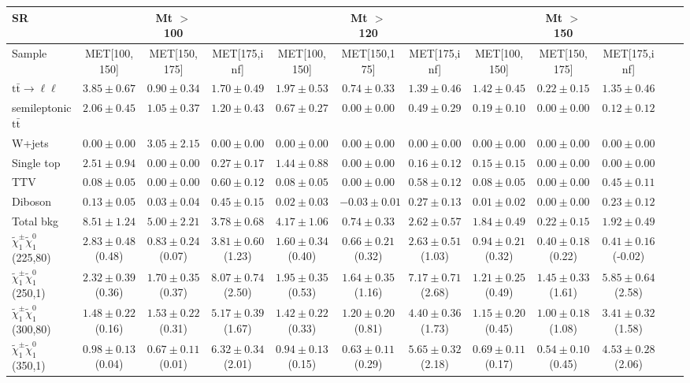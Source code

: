 \begin{table}
\begin{center}
\small
\begin{tabular}{lccccccccccc}
\hline
SR & & Mt $>$ 100 & & & Mt $>$ 120 & & &Mt $>$ 150 & & &\\
\hline
Sample&MET[100,150]&MET[150,175]&MET[175,inf]&MET[100,150]&MET[150,175]&MET[175,inf]&MET[100,150]&MET[150,175]&MET[175,inf]&\\
\hline
$\mathrm{t}\bar{\mathrm{t}}\rightarrow \ell\ell$&$3.85\pm0.67$&$0.90\pm0.34$&$1.70\pm0.49$&$1.97\pm0.53$&$0.74\pm0.33$&$1.39\pm0.46$&$1.42\pm0.45$&$0.22\pm0.15$&$1.35\pm0.46$\\
semileptonic $\mathrm{t}\bar{\mathrm{t}}$&$2.06\pm0.45$&$1.05\pm0.37$&$1.20\pm0.43$&$0.67\pm0.27$&$0.00\pm0.00$&$0.49\pm0.29$&$0.19\pm0.10$&$0.00\pm0.00$&$0.12\pm0.12$\\
W+jets&$0.00\pm0.00$&$3.05\pm2.15$&$0.00\pm0.00$&$0.00\pm0.00$&$0.00\pm0.00$&$0.00\pm0.00$&$0.00\pm0.00$&$0.00\pm0.00$&$0.00\pm0.00$\\
Single top&$2.51\pm0.94$&$0.00\pm0.00$&$0.27\pm0.17$&$1.44\pm0.88$&$0.00\pm0.00$&$0.16\pm0.12$&$0.15\pm0.15$&$0.00\pm0.00$&$0.00\pm0.00$\\
TTV&$0.08\pm0.05$&$0.00\pm0.00$&$0.60\pm0.12$&$0.08\pm0.05$&$0.00\pm0.00$&$0.58\pm0.12$&$0.08\pm0.05$&$0.00\pm0.00$&$0.45\pm0.11$\\
Diboson&$0.13\pm0.05$&$0.03\pm0.04$&$0.45\pm0.15$&$0.02\pm0.03$&$-0.03\pm0.01$&$0.27\pm0.13$&$0.01\pm0.02$&$0.00\pm0.00$&$0.23\pm0.12$\\
\hline
Total bkg&$8.51\pm1.24$&$5.00\pm2.21$&$3.78\pm0.68$&$4.17\pm1.06$&$0.74\pm0.33$&$2.62\pm0.57$&$1.84\pm0.49$&$0.22\pm0.15$&$1.92\pm0.49$\\
$\tilde{\chi}_{1}^{\pm}\tilde{\chi}_{1}^{0}$ (225,80)&$2.83\pm0.48$(0.48)&$0.83\pm0.24$(0.07)&$3.81\pm0.60$(1.23)&$1.60\pm0.34$(0.40)&$0.66\pm0.21$(0.32)&$2.63\pm0.51$(1.03)&$0.94\pm0.21$(0.32)&$0.40\pm0.18$(0.22)&$0.41\pm0.16$(-0.02)\\
$\tilde{\chi}_{1}^{\pm}\tilde{\chi}_{1}^{0}$ (250,1)&$2.32\pm0.39$(0.36)&$1.70\pm0.35$(0.37)&$8.07\pm0.74$(2.50)&$1.95\pm0.35$(0.53)&$1.64\pm0.35$(1.16)&$7.17\pm0.71$(2.68)&$1.21\pm0.25$(0.49)&$1.45\pm0.33$(1.61)&$5.85\pm0.64$(2.58)\\
$\tilde{\chi}_{1}^{\pm}\tilde{\chi}_{1}^{0}$ (300,80)&$1.48\pm0.22$(0.16)&$1.53\pm0.22$(0.31)&$5.17\pm0.39$(1.67)&$1.42\pm0.22$(0.33)&$1.20\pm0.20$(0.81)&$4.40\pm0.36$(1.73)&$1.15\pm0.20$(0.45)&$1.00\pm0.18$(1.08)&$3.41\pm0.32$(1.58)\\
$\tilde{\chi}_{1}^{\pm}\tilde{\chi}_{1}^{0}$ (350,1)&$0.98\pm0.13$(0.04)&$0.67\pm0.11$(0.01)&$6.32\pm0.34$(2.01)&$0.94\pm0.13$(0.15)&$0.63\pm0.11$(0.29)&$5.65\pm0.32$(2.18)&$0.69\pm0.11$(0.17)&$0.54\pm0.10$(0.45)&$4.53\pm0.28$(2.06)\\
\hline
\hline\hline
\end{tabular}
\end{center}
\end{table}

